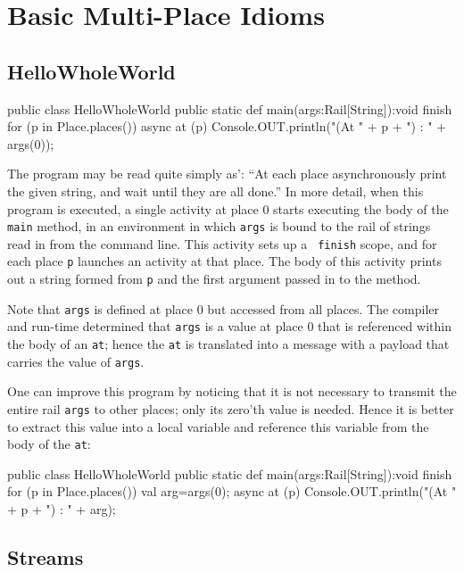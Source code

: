 \chapter{Basic Multi-Place Idioms}
\section{HelloWholeWorld}

{\footnotesize
\begin{xten}
public class HelloWholeWorld {
  public static def main(args:Rail[String]):void {
     finish
        for (p in Place.places())
          async
            at (p)
              Console.OUT.println("(At " + p + ") : " + args(0));
  }
}
\end{xten}}
The program may be read quite simply as': ``At each place
asynchronously print the given string, and wait until they are all
done.''   In more detail, when this program is executed, a single
activity at place $0$ starts executing the body of the {\tt main}
method, in an environment in which {\tt args} is bound to the rail of
strings read in from the command line. This activity sets up a {\tt
  finish} scope, and for each place {\tt p} launches an activity at
that place. The body of this activity prints out a string formed from
{\tt p} and the first argument passed in to the method. 

Note that {\tt args} is defined at place $0$ but accessed from all
places. The compiler and run-time determined that {\tt args} is a
value at place $0$ that is referenced within the body of an {\tt at};
hence the {\tt at} is translated into a message with a payload that
carries the value of {\tt args}. 

One can improve this program by noticing that it is not necessary to
transmit the entire rail {\tt args} to other places; only its zero'th
value is needed. Hence it is better to extract this value into a local
variable and reference this variable from the body of the {\tt at}:
{\footnotesize
\begin{xten}
public class HelloWholeWorld {
  public static def main(args:Rail[String]):void {
     finish
        for (p in Place.places()) {
          val arg=args(0);
          async
            at (p)
              Console.OUT.println("(At " + p + ") : " + arg);
      }
  }
}
\end{xten}}



\section{Streams}
